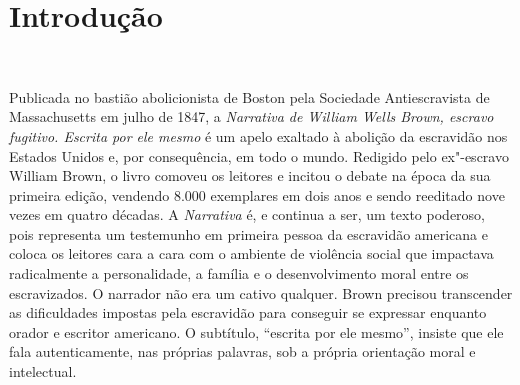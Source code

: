 \chapter*{Introdução}

\begin{flushright}
\\\vspace*{-3pt}
\end{flushright}

Publicada no bastião abolicionista de Boston
pela Sociedade Antiescravista de Massachusetts em julho de 1847, a
\emph{Narrativa de William Wells Brown, escravo fugitivo. Escrita
por ele mesmo} é um apelo exaltado à abolição da escravidão nos Estados
Unidos e, por consequência, em todo o mundo. Redigido pelo ex"-escravo
William Brown, o livro comoveu os leitores e incitou o debate na época
da sua primeira edição, vendendo 8.000 exemplares em dois anos e sendo
reeditado nove vezes em quatro décadas. A \emph{Narrativa} é, e continua
a ser, um texto poderoso, pois representa um testemunho em primeira
pessoa da escravidão americana e coloca os leitores cara a cara com o
ambiente de violência social que impactava radicalmente a personalidade,
a família e o desenvolvimento moral entre os escravizados. O narrador
não era um cativo qualquer. Brown precisou transcender as dificuldades
impostas pela escravidão para conseguir se expressar enquanto orador e
escritor americano. O subtítulo, ``escrita por ele mesmo'', insiste que
ele fala autenticamente, nas próprias palavras, sob a própria orientação
moral e intelectual.

